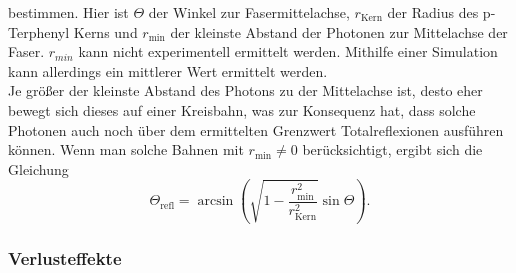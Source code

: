 bestimmen. Hier ist $\Theta$ der Winkel zur Fasermittelachse, $r_{\text{Kern}}$ der Radius des p-Terphenyl Kerns und $r_{\text{min}}$ der kleinste
Abstand der Photonen zur Mittelachse der Faser. $r_{min}$ kann nicht experimentell ermittelt werden. Mithilfe einer Simulation kann allerdings
ein mittlerer Wert ermittelt werden.\\
Je größer der kleinste Abstand des Photons zu der Mittelachse ist, desto eher bewegt sich dieses auf einer Kreisbahn, was zur Konsequenz hat,
dass solche Photonen auch noch über dem ermittelten Grenzwert Totalreflexionen ausführen können. Wenn man solche Bahnen mit $r_{\text{min}} \neq 0$ berücksichtigt,
ergibt sich die Gleichung
\begin{equation}
    \Theta_{\text{refl}} = \arcsin{\left(\sqrt{1 - \frac{r^2_{\text{min}}}{r^2_{\text{Kern}}}} \sin{\Theta}\right)}.
\end{equation}

\subsubsection{Verlusteffekte}

